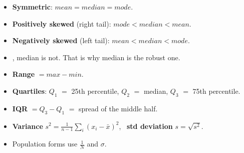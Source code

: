 {}{%
\begin{itemize}
  \item \textbf{Symmetric}: $mean = median = mode$.
  \item \textbf{Positively skewed} (right tail): $mode < median < mean$.
  \item \textbf{Negatively skewed} (left tail): $mean < median < mode$.
  \item {}, median is not. That is why median is the robust one.
\end{itemize}
\begin{itemize}
  \item \textbf{Range} $= max - min$.
  \item \textbf{Quartiles}: $Q_1$ $=$ 25th percentile, $Q_2$ $=$ median, $Q_3$ $=$ 75th percentile.
  \item \textbf{IQR} $= Q_3 - Q_1$ $=$ spread of the middle half.
  \item \textbf{Variance} $s^2 = \frac{1}{n-1}\sum_i (x_i-\bar{x})^2$, \
        \textbf{std deviation} $s = \sqrt{s^2}$.
  \item Population forms use $\frac{1}{N}$ and $\sigma$.
\end{itemize}}

